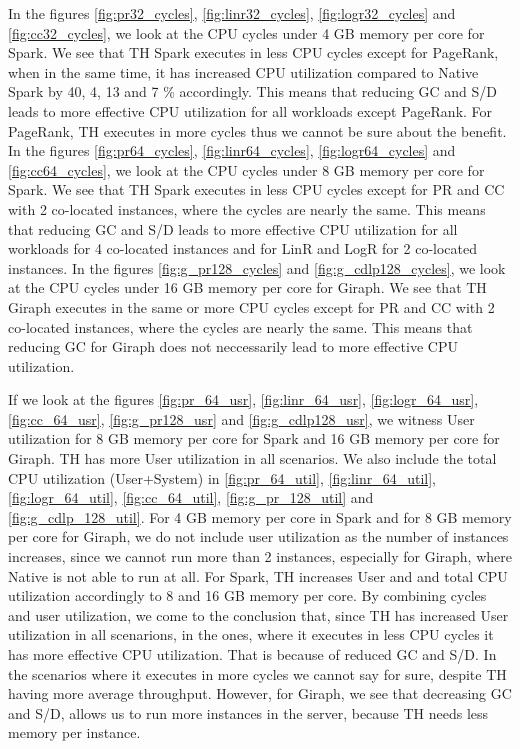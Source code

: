 In the figures \ref{fig:pr32_cycles}, \ref{fig:linr32_cycles}, \ref{fig:logr32_cycles} and \ref{fig:cc32_cycles}, we look at the CPU cycles under 4 GB memory per core for Spark. We see that TH Spark executes in less CPU cycles except for PageRank, when in the same time, it has increased CPU utilization compared to Native Spark by 40, 4, 13 and 7 \% accordingly.
This means that reducing GC and S/D leads to more effective CPU utilization for all workloads except PageRank. For PageRank, TH executes in more cycles thus we cannot be sure about the benefit.
In the figures \ref{fig:pr64_cycles}, \ref{fig:linr64_cycles}, \ref{fig:logr64_cycles} and \ref{fig:cc64_cycles}, we look at the CPU cycles under 8 GB memory per core for Spark. We see that TH Spark executes in less CPU cycles except for PR and CC with 2 co-located instances, where the cycles are nearly the same.
This means that reducing GC and S/D leads to more effective CPU utilization for all workloads for 4 co-located instances and for LinR and LogR for 2 co-located instances.
In the figures \ref{fig:g_pr128_cycles} and \ref{fig:g_cdlp128_cycles}, we look at the CPU cycles under 16 GB memory per core for Giraph. We see that TH Giraph executes in the same or more CPU cycles except for PR and CC with 2 co-located instances, where the cycles are nearly the same.
This means that reducing GC for Giraph does not neccessarily lead to more effective CPU utilization.

If we look at the figures \ref{fig:pr_64_usr}, \ref{fig:linr_64_usr}, \ref{fig:logr_64_usr}, \ref{fig:cc_64_usr}, \ref{fig:g_pr128_usr} and \ref{fig:g_cdlp128_usr}, we witness User utilization for 8 GB memory per core for Spark and 16 GB memory per core for Giraph. TH has more User utilization in all scenarios.
We also include the total CPU utilization (User+System) in \ref{fig:pr_64_util}, \ref{fig:linr_64_util}, \ref{fig:logr_64_util}, \ref{fig:cc_64_util}, \ref{fig:g_pr_128_util} and \ref{fig:g_cdlp_128_util}.
For 4 GB memory per core in Spark and for 8 GB memory per core for Giraph, we do not include user utilization as the number of instances increases, since we cannot run more than 2 instances, especially for Giraph, where Native is not able to run at all. For Spark, TH increases User and and total CPU utilization accordingly to 8 and 16 GB memory per core.
By combining cycles and user utilization, we come to the conclusion that, since TH has increased User utilization in all scenarions, in the ones, where it executes in less CPU cycles it has more effective CPU utilization. That is because of reduced GC and S/D. In the scenarios where it executes in more cycles we cannot say for sure, despite TH having more average throughput. However, for Giraph, we see that decreasing GC and S/D, allows us to run more instances in the server, because TH needs less memory per instance.


